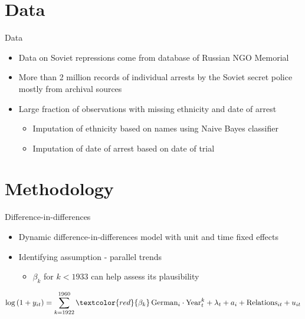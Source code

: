 \documentclass[11pt]{beamer}
\begin{document}
\section{Data}
\begin{frame}[label=data]{Data}
\begin{itemize}
    \item Data on Soviet repressions come from database of Russian NGO  Memorial
    \item More than 2 million records of individual arrests by the Soviet secret police mostly from archival sources
    \item Large fraction of observations with missing ethnicity and date of arrest 
    \begin{itemize}
        \item Imputation of ethnicity based on names using Naive Bayes  classifier  \hyperlink{ethnicity_imputation}{}
        \item Imputation of date of arrest based on date of trial \hyperlink{arrest_date_imputation}{}
    \end{itemize}
    
\end{itemize}
\end{frame}

\section{Methodology}
\begin{frame}{Difference-in-differences}
\begin{itemize}
    \item Dynamic difference-in-differences model with unit and time fixed effects
    \item Identifying assumption - parallel trends 
    \begin{itemize}
        \item $\beta_k$ for $k < 1933$ can help assess its plausibility
    \end{itemize}
\end{itemize}

\begin{equation*}
 \log\left(1 + y_{it}\right) = \sum_{k= 1922}^{1960} \textcolor{red}{\beta_k}  \, \text{German}_{i} \cdot \text{Year}_{t}^k +  \lambda_t + a_i +  \text{Relations}_{it}   + u_{it}
 \label{eq:dynamic_did}
\end{equation*}
\end{frame}
\end{document}
